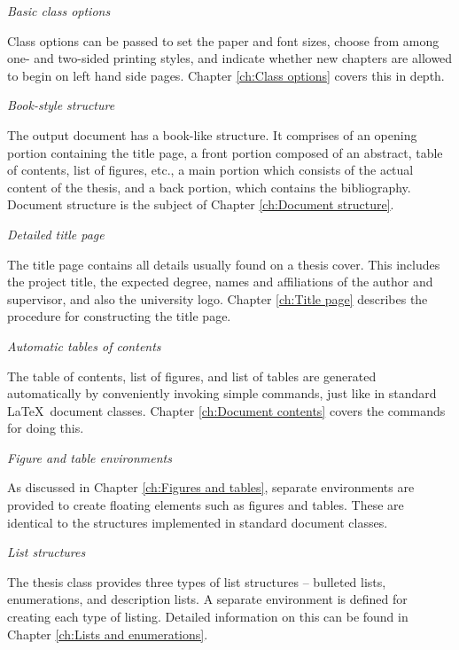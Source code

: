 \documentclass[twoside,openany]{thesis}
\begin{document}
\begin{listing}

\item   {\itshape Basic class options}

        Class options can be passed to set the paper and font sizes, choose from among one- and two-sided printing styles, and indicate whether new chapters are allowed to begin on left hand side pages.
        Chapter \ref{ch:Class options} covers this in depth.

\item   {\itshape Book-style structure}

        The output document has a book-like structure.
        It comprises of an opening portion containing the title page, a front portion composed of an abstract, table of contents, list of figures, etc., a main portion which consists of the actual content of the thesis, and a back portion, which contains the bibliography.
        Document structure is the subject of Chapter \ref{ch:Document structure}.

\item   {\itshape Detailed title page}

        The title page contains all details usually found on a thesis cover.
        This includes the project title, the expected degree, names and affiliations of the author and supervisor, and also the university logo.
        Chapter \ref{ch:Title page} describes the procedure for constructing the title page.

\item   {\itshape Automatic tables of contents}

        The table of contents, list of figures, and list of tables are generated automatically by conveniently invoking simple commands, just like in standard \LaTeX\ document classes.
        Chapter \ref{ch:Document contents} covers the commands for doing this.

\clearpage

\item   {\itshape Figure and table environments}

        As discussed in Chapter \ref{ch:Figures and tables}, separate environments are provided to create floating elements such as figures and tables.
        These are identical to the structures implemented in standard document classes.

\item   {\itshape List structures}

        The {\ttfamily thesis} class provides three types of list structures -- bulleted lists, enumerations, and description lists.
        A separate environment is defined for creating each type of listing.
        Detailed information on this can be found in Chapter \ref{ch:Lists and enumerations}.


\end{listing}
\end{document}
